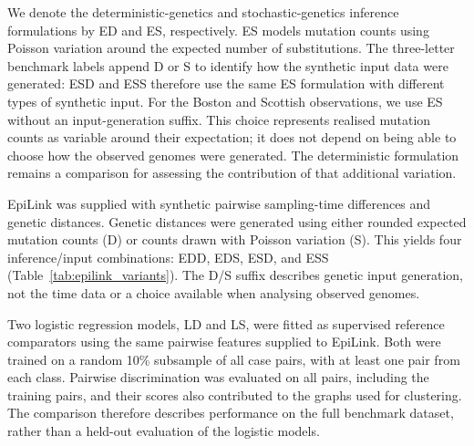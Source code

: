 We denote the deterministic-genetics and stochastic-genetics inference formulations by ED and ES, respectively. ES models mutation counts using Poisson variation around the expected number of substitutions. The three-letter benchmark labels append D or S to identify how the synthetic input data were generated: ESD and ESS therefore use the same ES formulation with different types of synthetic input. For the Boston and Scottish observations, we use ES without an input-generation suffix. This choice represents realised mutation counts as variable around their expectation; it does not depend on being able to choose how the observed genomes were generated. The deterministic formulation remains a comparison for assessing the contribution of that additional variation.

EpiLink was supplied with synthetic pairwise sampling-time differences and genetic distances. Genetic distances were generated using either rounded expected mutation counts (D) or counts drawn with Poisson variation (S). This yields four inference/input combinations: EDD, EDS, ESD, and ESS (Table~\ref{tab:epilink_variants}). The D/S suffix describes genetic input generation, not the time data or a choice available when analysing observed genomes.

Two logistic regression models, LD and LS, were fitted as supervised reference comparators using the same pairwise features supplied to EpiLink. Both were trained on a random 10\% subsample of all case pairs, with at least one pair from each class. Pairwise discrimination was evaluated on all pairs, including the training pairs, and their scores also contributed to the graphs used for clustering. The comparison therefore describes performance on the full benchmark dataset, rather than a held-out evaluation of the logistic models.

